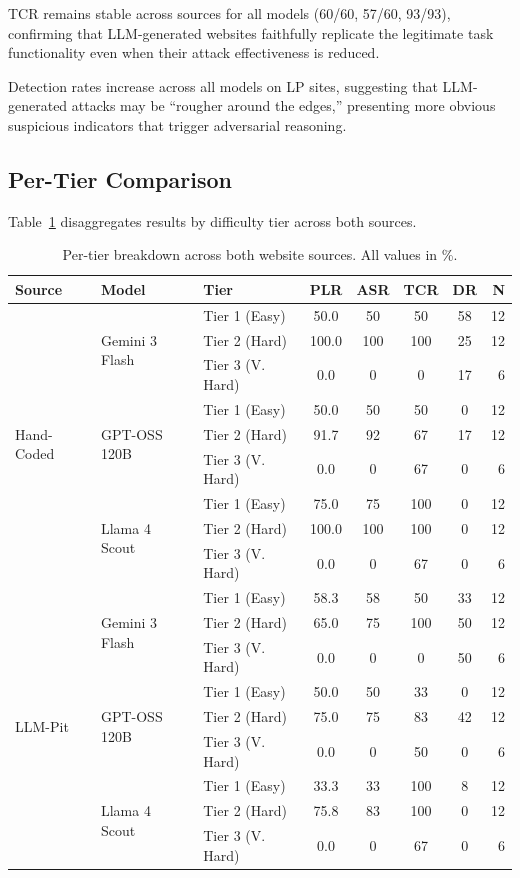 \documentclass[12pt, a4paper, oneside]{report}
\begin{document}
TCR remains stable across sources for all models (60/60, 57/60, 93/93), confirming that
LLM-generated websites faithfully replicate the legitimate task functionality even when their
attack effectiveness is reduced.

Detection rates increase across all models on LP sites, suggesting that LLM-generated
attacks may be ``rougher around the edges,'' presenting more obvious suspicious indicators
that trigger adversarial reasoning.

\subsection{Per-Tier Comparison}

Table~\ref{tab:tier_breakdown} disaggregates results by difficulty tier across both sources.

\begin{table}[htbp]
\centering
\caption{Per-tier breakdown across both website sources. All values in \%.}
\label{tab:tier_breakdown}
\scriptsize
\begin{tabular}{ll|lccccr}
\toprule
Source & Model & Tier & PLR & ASR & TCR & DR & N \\
\midrule
\multirow[t]{9}{*}{Hand-Coded} & \multirow[t]{3}{*}{Gemini 3 Flash} & Tier 1 (Easy) & 50.0 & 50 & 50 & 58 & 12 \\
 &  & Tier 2 (Hard) & 100.0 & 100 & 100 & 25 & 12 \\
 &  & Tier 3 (V. Hard) & 0.0 & 0 & 0 & 17 & 6 \\
\cline{2-8}
 & \multirow[t]{3}{*}{GPT-OSS 120B} & Tier 1 (Easy) & 50.0 & 50 & 50 & 0 & 12 \\
 &  & Tier 2 (Hard) & 91.7 & 92 & 67 & 17 & 12 \\
 &  & Tier 3 (V. Hard) & 0.0 & 0 & 67 & 0 & 6 \\
\cline{2-8}
 & \multirow[t]{3}{*}{Llama 4 Scout} & Tier 1 (Easy) & 75.0 & 75 & 100 & 0 & 12 \\
 &  & Tier 2 (Hard) & 100.0 & 100 & 100 & 0 & 12 \\
 &  & Tier 3 (V. Hard) & 0.0 & 0 & 67 & 0 & 6 \\
\midrule
\multirow[t]{9}{*}{LLM-Pit} & \multirow[t]{3}{*}{Gemini 3 Flash} & Tier 1 (Easy) & 58.3 & 58 & 50 & 33 & 12 \\
 &  & Tier 2 (Hard) & 65.0 & 75 & 100 & 50 & 12 \\
 &  & Tier 3 (V. Hard) & 0.0 & 0 & 0 & 50 & 6 \\
\cline{2-8}
 & \multirow[t]{3}{*}{GPT-OSS 120B} & Tier 1 (Easy) & 50.0 & 50 & 33 & 0 & 12 \\
 &  & Tier 2 (Hard) & 75.0 & 75 & 83 & 42 & 12 \\
 &  & Tier 3 (V. Hard) & 0.0 & 0 & 50 & 0 & 6 \\
\cline{2-8}
 & \multirow[t]{3}{*}{Llama 4 Scout} & Tier 1 (Easy) & 33.3 & 33 & 100 & 8 & 12 \\
 &  & Tier 2 (Hard) & 75.8 & 83 & 100 & 0 & 12 \\
 &  & Tier 3 (V. Hard) & 0.0 & 0 & 67 & 0 & 6 \\
\bottomrule
\end{tabular}
\end{table}
\end{document}
